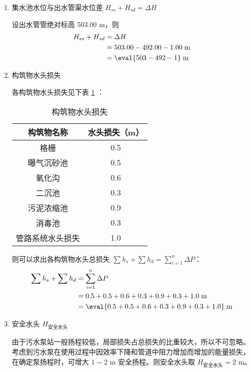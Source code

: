 \begin{enumerate}
	\item 集水池水位与出水管渠水位差 $H_{ss}+H_{sd} = \Delta H$
	
	
	设出水管管绝对标高 503.00 m，则
	\begin{align}
		H_{ss}+H_{sd} &= \Delta H \\
		&= 503.00-492.00-1.00 \;\text{m} \notag \\
		&= \eval{503-492-1} \;\text{m} \notag
	\end{align}

	\item 构筑物水头损失
	
	各构筑物水头损失见下表 \ref{tab:Loss of head of the structure} ：
	\begin{table}[H]
		\centering
		\caption{构筑物水头损失}
		\begin{tabular}{cc}
		\toprule
		构筑物名称 & 水头损失（m） \\
		\midrule
		格栅    & 0.5 \\
		曝气沉砂池 & 0.5 \\
		氧化沟 & 0.6 \\
		二沉池   & 0.3 \\
		污泥浓缩池   & 0.9 \\
		消毒池   & 0.3 \\
		管路系统水头损失 & 1.0 \\
		\bottomrule
		\end{tabular}%
		\label{tab:Loss of head of the structure}
	\end{table}
	则可以求出各构筑物水头总损失 $\sum{h_{s}}+\sum{h_{d}} = \sum\limits_{i=1}^{n}\Delta P$：
	\begin{align}
		\sum{h_{s}}+\sum{h_{d}} &= \sum_{i=1}^{n}\Delta P \\
		&= 0.5+0.5+0.6+0.3+0.9+0.3+1.0 \;\text{m} \notag \\
		&= \eval{0.5+0.5+0.6+0.3+0.9+0.3+1.0} \;\text{m} \notag
	\end{align}

	\item 安全水头 $H_{\text{安全水头}}$
	
	由于污水泵站一般扬程较低，局部损失占总损失的比重较大，所以不可忽略。考虑到污水泵在使用过程中因效率下降和管道中阻力增加而增加的能量损失，在确定泵扬程时，可增大 $1 \sim 2$ m 安全扬程。则安全水头取 $H_{\text{安全水头}}=2$ m。
\end{enumerate}
